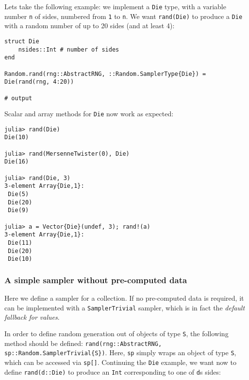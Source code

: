 Let{\textquotesingle}s take the following example: we implement a \texttt{Die} type, with a variable number \texttt{n} of sides, numbered from \texttt{1} to \texttt{n}. We want \texttt{rand(Die)} to produce a \texttt{Die} with a random number of up to 20 sides (and at least 4):




\begin{verbatim}
struct Die
    nsides::Int # number of sides
end

Random.rand(rng::AbstractRNG, ::Random.SamplerType{Die}) = Die(rand(rng, 4:20))

# output

\end{verbatim}



Scalar and array methods for \texttt{Die} now work as expected:




\begin{verbatim}
julia> rand(Die)
Die(10)

julia> rand(MersenneTwister(0), Die)
Die(16)

julia> rand(Die, 3)
3-element Array{Die,1}:
 Die(5)
 Die(20)
 Die(9)

julia> a = Vector{Die}(undef, 3); rand!(a)
3-element Array{Die,1}:
 Die(11)
 Die(20)
 Die(10)
\end{verbatim}



\hypertarget{14351717451744151937}{}


\subsubsection{A simple sampler without pre-computed data}



Here we define a sampler for a collection. If no pre-computed data is required, it can be implemented with a \texttt{SamplerTrivial} sampler, which is in fact the \emph{default fallback for values}.



In order to define random generation out of objects of type \texttt{S}, the following method should be defined: \texttt{rand(rng::AbstractRNG, sp::Random.SamplerTrivial\{S\})}. Here, \texttt{sp} simply wraps an object of type \texttt{S}, which can be accessed via \texttt{sp[]}. Continuing the \texttt{Die} example, we want now to define \texttt{rand(d::Die)} to produce an \texttt{Int} corresponding to one of \texttt{d}{\textquotesingle}s sides:




